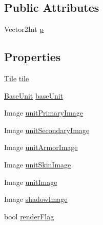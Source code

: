 \subsection*{Public Attributes}
\begin{DoxyCompactItemize}
\item 
Vector2\+Int \mbox{\hyperlink{class_unit_behaviour_ae1d622ff10d142433b35f6c2352b97e4}{p}}
\end{DoxyCompactItemize}
\subsection*{Properties}
\begin{DoxyCompactItemize}
\item 
\mbox{\hyperlink{class_tile}{Tile}} \mbox{\hyperlink{class_unit_behaviour_a88e52afa84a4a9615e6cba0d610af427}{tile}}
\item 
\mbox{\hyperlink{class_base_unit}{Base\+Unit}} \mbox{\hyperlink{class_unit_behaviour_a05cd74b1093c4a86d9a3556af9b3dad3}{base\+Unit}}
\item 
Image \mbox{\hyperlink{class_unit_behaviour_a0afb662d96ad5a159fefbac272992f33}{unit\+Primary\+Image}}
\item 
Image \mbox{\hyperlink{class_unit_behaviour_a5525b89693e66bdf365c80da19b7be5b}{unit\+Secondary\+Image}}
\item 
Image \mbox{\hyperlink{class_unit_behaviour_aee71a6c63565092ebb1b0db713966d5e}{unit\+Armor\+Image}}
\item 
Image \mbox{\hyperlink{class_unit_behaviour_a8e85eeaf7ce34b0b04a96258aacf02d7}{unit\+Skin\+Image}}
\item 
Image \mbox{\hyperlink{class_unit_behaviour_a6b47dd14b934843a2a09bc912abac2f3}{unit\+Image}}
\item 
Image \mbox{\hyperlink{class_unit_behaviour_a71c6dafe4e7e8c204bfa2a0c131a8f43}{shadow\+Image}}
\item 
bool \mbox{\hyperlink{class_unit_behaviour_a967462055b4f06234aa94f867b162658}{render\+Flag}}
\end{DoxyCompactItemize}


